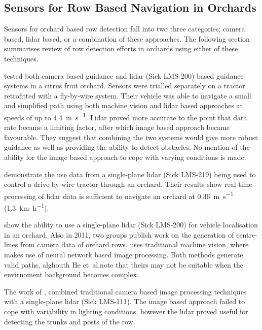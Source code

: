\documentclass[preprint,authoryear,12pt]{elsarticle}
\begin{document}
    \subsection{Sensors for Row Based Navigation in Orchards}

        Sensors for orchard based row detection fall into two three categories; camera based, lidar based, or a combination of these approaches.
        The following section summarises review of row detection efforts in orchards using either of these techniques.

        \cite{Subramanian2006} tested both camera based guidance and lidar (Sick LMS-200) based guidance systems in a citrus fruit orchard.
        Sensors were trialled separately on a tractor retrofitted with a fly-by-wire system.
        Their vehicle was able to navigate a small and simplified path using both machine vision and lidar based approaches at speeds of up to \SI{4.4}{\meter\per\second}.
        Lidar proved more accurate to the point that data rate became a limiting factor, after which image based approach became favourable.
        They suggest that combining the two systems would give more robust guidance as well as providing the ability to detect obstacles.
        No mention of the ability for the image based approach to cope with varying conditions is made.

        \cite{Barawid2007} demonstrate the use data from a single-plane lidar (Sick LMS-219) being used to control a drive-by-wire tractor through an orchard.
        Their results show real-time processing of lidar data is sufficient to navigate an orchard at \SI{0.36}{\meter\per\second} (\SI{1.3}{\kilo\meter\per\hour}).

        \cite{Hansen2011} show the ability to use a single-plane lidar (Sick LMS-200) for vehicle localisation in an orchard.
        Also in 2011, two groups publish work on the generation of centre-lines from camera data of orchard rows.
        \cite{He2011} uses traditional machine vision, where \cite{Torres2011} makes use of neural network based image processing.
        Both methods generate valid paths, alghouth He et~al.\@ note that theirs may not be suitable when the envirnoment background becomes complex.

        The work of \cite{Scarfe2012}, combined traditional camera based image processing techniques with a single-plane lidar (Sick LMS-111).
        The image based approach failed to cope with variability in lighting conditions, however the lidar proved useful for detecting the trunks and posts of the row.
\end{document}
